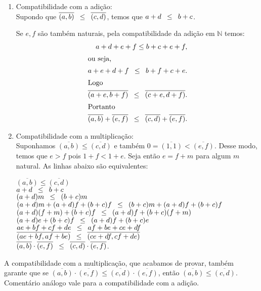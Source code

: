 \documentclass[../main.tex]{subfiles}
\begin{document}
\begin{dem}
\begin{enumerate}[label=(\roman*)]
        \item Compatibilidade com a adição: \\
        Supondo que $\overline{(a,b)} \hspace{8pt} {\leq} \hspace{8pt} \overline{(c,d)}$, temos que $a+d \hspace{8pt} {\leq} \hspace{8pt} b+c$. 

            Se $e, f$ são também naturais, pela compatibilidade da adição em $\mathbb{N}$ temos: \\
        \begin{align*}    
            a+d +e+f \leq b+c+e+f, \\ \shortintertext{ou seja,}
            a + e + d +f \hspace{8pt} {\leq} \hspace{8pt} b + f + c + e. \\ \shortintertext{Logo}
            \overline{(a+e,b+f)} \hspace{8pt} {\leq} \hspace{8pt} \overline{(c+e, d+f)}. \\ \shortintertext{Portanto}
            \overline{(a,b)} + \overline{(e,f)} \hspace{8pt} {\leq} \hspace{8pt} \overline{(c,d)} + \overline{(e,f)}.
        \end{align*}

        
        \item Compatibilidade com a multiplicação: \\
        Suponhamos $\overline{(a,b)} \leq \overline{(c,d)}$ e também $0 = \overline{(1,1)} < \overline{(e,f)}$.
        Desse modo, temos que $e > f$ pois $1+f < 1+e$. Seja então $e = f+m$ para algum $m$ natural. As linhas abaixo são equivalentes:
        \begin{center}
            $\overline{(a,b)} \leq \overline{(c,d)}$\\
            $a+d \hspace{8pt} {\leq} \hspace{8pt} b+c  $\\
            $(a+d)m \hspace{8pt} {\leq} \hspace{8pt} (b+c)m $ \\
            $(a+d)m + (a+d)f + (b+c)f \hspace{8pt} {\leq} \hspace{8pt} (b+c)m + (a+d)f + (b+c)f$ \\
            $(a+d)(f+m) + (b+c)f \hspace{8pt} {\leq} \hspace{8pt} (a+d)f + (b+c)(f+m)$ \\
            $(a+d)e + (b+c)f \hspace{8pt} {\leq} \hspace{8pt} (a+d)f + (b+c)e$ \\
            $ae+bf + cf+de \hspace{8pt} {\leq} \hspace{8pt} af+be + ce+df  $\\
            $\overline{(ae+bf, af+be)} \hspace{8pt} {\leq} \hspace{8pt} \overline{(ce+df, cf+de)}  $ \\           
            $\overline{(a,b)} \cdot \overline{(e,f)} \hspace{8pt} {\leq} \hspace{8pt} \overline{(c,d)} \cdot \overline{(e,f)}$.
        \end{center}        
        
    \end{enumerate}
\end{dem}
\begin{obs}
    A compatibilidade com a multiplicação, que acabamos de provar, também garante que se $\overline{(a,b)} \cdot \overline{(e,f)} 
    \leq \overline{(c,d)} \cdot \overline{(e,f)}$, então $\overline{(a,b)} \leq \overline{(c,d)}$. Comentário análogo vale para a compatibilidade com a adição.
\end{obs}
\end{document}
